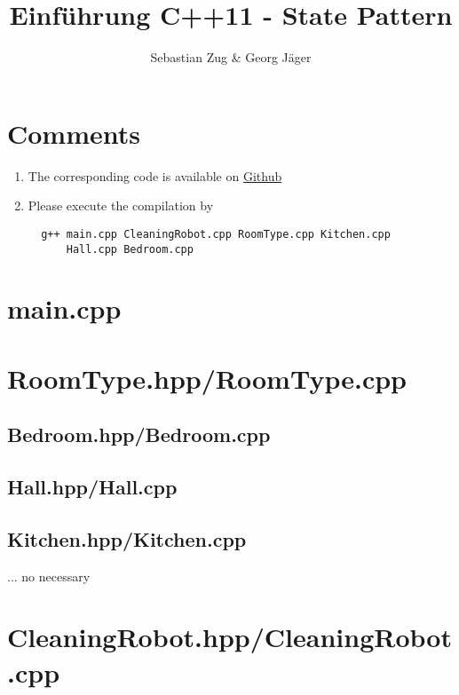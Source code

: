 \documentclass{scrartcl}
\begin{document}
\title{Einf\"uhrung C++11 - State Pattern}
\author{Sebastian Zug \& Georg J\"ager}
\date{}
\maketitle

\section{Comments }

\begin{enumerate}
  \item The corresponding code is available on \href{https://github.com/SebastianZug/SoftwareprojektRobotik/tree/master/examples/05_DesginPattern}{Github}
  \item Please execute the compilation by

  \begin{verbatim}
  g++ main.cpp CleaningRobot.cpp RoomType.cpp Kitchen.cpp
      Hall.cpp Bedroom.cpp
  \end{verbatim}

\end{enumerate}

\section{main.cpp}



\section{RoomType.hpp/RoomType.cpp}




\subsection{Bedroom.hpp/Bedroom.cpp}




\subsection{Hall.hpp/Hall.cpp}




\subsection{Kitchen.hpp/Kitchen.cpp}
... no necessary

\section{CleaningRobot.hpp/CleaningRobot.cpp}



\end{document}
